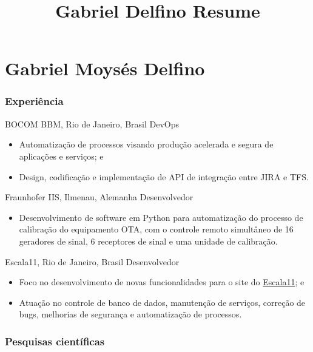 \documentclass{tccv}
\title{Gabriel Delfino Resume}
\begin{document}
\part{Gabriel Moysés Delfino}


\section{Experiência}

    \begin{eventlist}

            {BOCOM BBM, Rio de Janeiro, Brasil}
            {DevOps}
            \begin{itemize}
                \item Automatização de processos visando produção acelerada e segura de aplicações e serviços; e
                \item Design, codificação e implementação de API de integração entre JIRA e TFS.
            \end{itemize}
 
            {Fraunhofer IIS, Ilmenau, Alemanha}
            {Desenvolvedor}
            \begin{itemize}
                \item Desenvolvimento de software em Python para automatização do processo de calibração do equipamento OTA, com o controle remoto simultâneo de 16 geradores de sinal, 6 receptores de sinal e uma unidade de calibração.
            \end{itemize}
        
            {Escala11, Rio de Janeiro, Brasil}
            {Desenvolvedor}
            \begin{itemize}
                \item Foco no desenvolvimento de novas funcionalidades para o site do \href{https://www.escala11.com/}{Escala11}; e
                \item Atuação no controle de banco de dados, manutenção de serviços, correção de bugs, melhorias de segurança e automatização de processos.
            \end{itemize}
    \end{eventlist}

\section{Pesquisas científicas}
\end{document}
